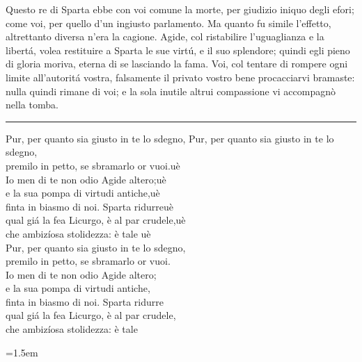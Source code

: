 \documentclass[a5paper,11pt]{book}
\def\testodicontrollo{%
Questo re di Sparta ebbe con voi comune la morte, per giudizio
iniquo degli efori; come voi, per quello d'un ingiusto parlamento.
Ma quanto fu simile l'effetto, altrettanto diversa n'era la
cagione. Agide, col ristabilire l'uguaglianza e la libertá, volea
restituire a Sparta le sue virtú, e il suo splendore; quindi egli
pieno di gloria moriva, eterna di se lasciando la fama. Voi, col
tentare di rompere ogni limite all'autoritá vostra, falsamente il
privato vostro bene procacciarvi bramaste: nulla quindi rimane di
voi; e la sola inutile altrui compassione vi accompagnò nella
tomba.
}
\begin{document}
\testodicontrollo

\noindent\rule{\leftmargini}{1pt}

\begin{versedrama}
  Pur, per quanto sia giusto in te lo sdegno, Pur, per quanto sia giusto in te lo sdegno,\\
  premilo in petto, se sbramarlo or vuoi.uè\\
  Io men di te non odio Agide altero;uè\\
  e la sua pompa di virtudi antiche,uè\\
  finta in biasmo di noi. Sparta ridurreuè\\
  qual giá la fea Licurgo, è al par crudele,uè\\
  che ambizíosa stolidezza: è tale\hspace{0pt plus 1filll} uè\\
  Pur, per quanto sia giusto in te lo sdegno,\\
  premilo in petto, se sbramarlo or vuoi.\\
  Io men di te non odio Agide altero;\\
  e la sua pompa di virtudi antiche,\\
  finta in biasmo di noi. Sparta ridurre\\
  qual giá la fea Licurgo, è al par crudele,\\
  che ambizíosa stolidezza: è tale\\
\end{versedrama}

\leftmargini=1.5em
\end{document}
